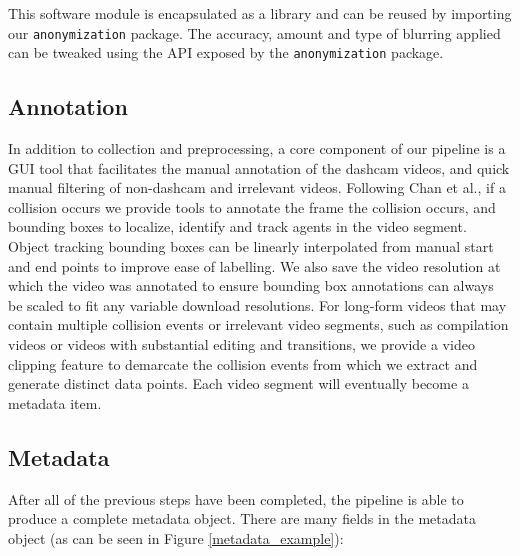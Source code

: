 \documentclass[letterpaper, 10 pt, conference]{ieeeconf}
\begin{document}
This software module is encapsulated as a library and can be reused by importing our \texttt{anonymization} package. The accuracy, amount and type of blurring applied can be tweaked using the API exposed by the \texttt{anonymization} package.

\subsection{Annotation}

In addition to collection and preprocessing, a core component of our pipeline is a GUI tool that facilitates the manual annotation of the dashcam videos, and quick manual filtering of non-dashcam and irrelevant videos. Following Chan et al.\cite{chan2016anticipating}, if a collision occurs we provide tools to annotate the frame the collision occurs, and bounding boxes to localize, identify and track agents in the video segment. Object tracking bounding boxes can be linearly interpolated from manual start and end points to improve ease of labelling. We also save the video resolution at which the video was annotated to ensure bounding box annotations can always be scaled to fit any variable download resolutions. For long-form videos that may contain multiple collision events or irrelevant video segments, such as compilation videos or videos with substantial editing and transitions, we provide a video clipping feature to demarcate the collision events from which we extract and generate distinct data points. 
Each video segment will eventually become a metadata item. 

\subsection{Metadata}
After all of the previous steps have been completed, the pipeline is able to produce a complete metadata object.
There are many fields in the metadata object (as can be seen in Figure \ref{metadata_example}):
\end{document}
